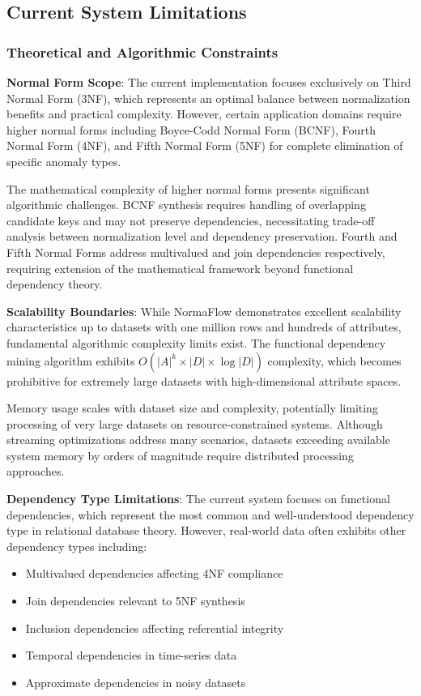 \documentclass[acmsmall]{acmart}
\begin{document}
\subsection{Current System Limitations}

\subsubsection{Theoretical and Algorithmic Constraints}

\textbf{Normal Form Scope}: The current implementation focuses exclusively on Third Normal Form (3NF), which represents an optimal balance between normalization benefits and practical complexity. However, certain application domains require higher normal forms including Boyce-Codd Normal Form (BCNF), Fourth Normal Form (4NF), and Fifth Normal Form (5NF) for complete elimination of specific anomaly types.

The mathematical complexity of higher normal forms presents significant algorithmic challenges. BCNF synthesis requires handling of overlapping candidate keys and may not preserve dependencies, necessitating trade-off analysis between normalization level and dependency preservation. Fourth and Fifth Normal Forms address multivalued and join dependencies respectively, requiring extension of the mathematical framework beyond functional dependency theory.

\textbf{Scalability Boundaries}: While NormaFlow demonstrates excellent scalability characteristics up to datasets with one million rows and hundreds of attributes, fundamental algorithmic complexity limits exist. The functional dependency mining algorithm exhibits $O(|A|^k \times |D| \times \log |D|)$ complexity, which becomes prohibitive for extremely large datasets with high-dimensional attribute spaces.

Memory usage scales with dataset size and complexity, potentially limiting processing of very large datasets on resource-constrained systems. Although streaming optimizations address many scenarios, datasets exceeding available system memory by orders of magnitude require distributed processing approaches.

\textbf{Dependency Type Limitations}: The current system focuses on functional dependencies, which represent the most common and well-understood dependency type in relational database theory. However, real-world data often exhibits other dependency types including:
\begin{itemize}
\item Multivalued dependencies affecting 4NF compliance
\item Join dependencies relevant to 5NF synthesis  
\item Inclusion dependencies affecting referential integrity
\item Temporal dependencies in time-series data
\item Approximate dependencies in noisy datasets
\end{itemize}
\end{document}
